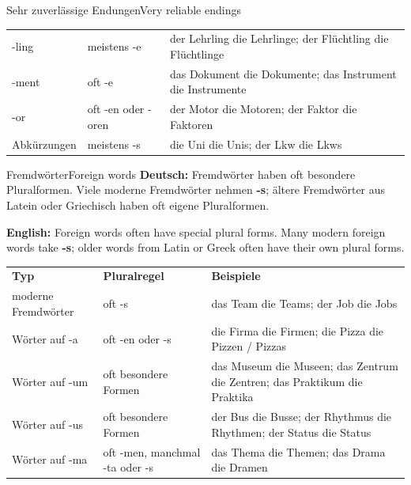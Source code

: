 \documentclass[a4paper,11pt]{article}
\newcommand{\GermanText}[1]{\textbf{Deutsch: }#1\par}
\newcommand{\EnglishText}[1]{{\small\color{SoftGray}\textbf{English: }#1\par}}
\newcommand{\TableHead}[3]{\rowcolor{HeaderBlueDark}\color{white}\textbf{#1} & \color{white}\textbf{#2} & \color{white}\textbf{#3}\\}
\begin{document}
\begin{grammarentry}{Sehr zuverlässige Endungen}{Very reliable endings}
\begin{longtable}{>{\RaggedRight\arraybackslash}p{}>{\RaggedRight\arraybackslash}p{}>{\RaggedRight\arraybackslash}p{}}
\rowcolor{RowBlueDark} -ling & meistens -e & der Lehrling \textrightarrow{} die Lehrlinge; der Flüchtling \textrightarrow{} die Flüchtlinge \\
\rowcolor{RowBlueLight} -ment & oft -e & das Dokument \textrightarrow{} die Dokumente; das Instrument \textrightarrow{} die Instrumente \\
\rowcolor{RowBlueDark} -or & oft -en oder -oren & der Motor \textrightarrow{} die Motoren; der Faktor \textrightarrow{} die Faktoren \\
\rowcolor{RowBlueLight} Abkürzungen & meistens -s & die Uni \textrightarrow{} die Unis; der Lkw \textrightarrow{} die Lkws \\
\end{longtable}
\end{grammarentry}

\begin{grammarentry}{Fremdwörter}{Foreign words}
\GermanText{Fremdwörter haben oft besondere Pluralformen. Viele moderne Fremdwörter nehmen \textbf{-s}; ältere Fremdwörter aus Latein oder Griechisch haben oft eigene Pluralformen.}
\EnglishText{Foreign words often have special plural forms. Many modern foreign words take \textbf{-s}; older words from Latin or Greek often have their own plural forms.}

\begin{longtable}{>{\RaggedRight\arraybackslash}p{}>{\RaggedRight\arraybackslash}p{}>{\RaggedRight\arraybackslash}p{}}
\TableHead{Typ}{Pluralregel}{Beispiele}
\rowcolor{RowBlueLight} moderne Fremdwörter & oft -s & das Team \textrightarrow{} die Teams; der Job \textrightarrow{} die Jobs \\
\rowcolor{RowBlueDark} Wörter auf -a & oft -en oder -s & die Firma \textrightarrow{} die Firmen; die Pizza \textrightarrow{} die Pizzen / Pizzas \\
\rowcolor{RowBlueLight} Wörter auf -um & oft besondere Formen & das Museum \textrightarrow{} die Museen; das Zentrum \textrightarrow{} die Zentren; das Praktikum \textrightarrow{} die Praktika \\
\rowcolor{RowBlueDark} Wörter auf -us & oft besondere Formen & der Bus \textrightarrow{} die Busse; der Rhythmus \textrightarrow{} die Rhythmen; der Status \textrightarrow{} die Status \\
\rowcolor{RowBlueLight} Wörter auf -ma & oft -men, manchmal -ta oder -s & das Thema \textrightarrow{} die Themen; das Drama \textrightarrow{} die Dramen \\
\end{longtable}
\end{grammarentry}
\end{document}
